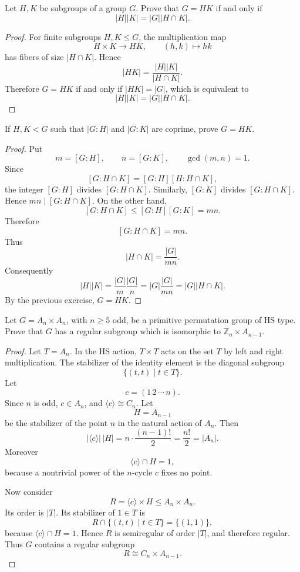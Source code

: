 \begin{exercise}
Let \(H,K\) be subgroups of a group \(G\). Prove that \(G = HK\) if and only if
\[
    |H||K| = |G||H \cap K|.
\]
\end{exercise}

\begin{proof}
For finite subgroups \(H,K\leq G\), the multiplication map
\[
    H\times K\longrightarrow HK,
    \qquad
    (h,k)\mapsto hk
\]
has fibers of size \(|H\cap K|\). Hence
\[
    |HK|=\frac{|H||K|}{|H\cap K|}.
\]
Therefore \(G=HK\) if and only if \(|HK|=|G|\), which is equivalent to
\[
    |H||K|=|G||H\cap K|.
\]
\end{proof}

\begin{exercise}
If \(H,K < G\) such that \(|G:H|\) and \(|G:K|\) are coprime, prove
\(G = HK\).
\end{exercise}

\begin{proof}
Put
\[
    m=[G:H],
    \qquad
    n=[G:K],
    \qquad
    \gcd(m,n)=1.
\]
Since
\[
    [G:H\cap K]=[G:H][H:H\cap K],
\]
the integer \([G:H]\) divides \([G:H\cap K]\). Similarly, \([G:K]\) divides
\([G:H\cap K]\). Hence \(mn\mid [G:H\cap K]\). On the other hand,
\[
    [G:H\cap K]\leq [G:H][G:K]=mn.
\]
Therefore
\[
    [G:H\cap K]=mn.
\]
Thus
\[
    |H\cap K|=\frac{|G|}{mn}.
\]
Consequently
\[
    |H||K|
    =
    \frac{|G|}{m}\frac{|G|}{n}
    =
    |G|\frac{|G|}{mn}
    =
    |G||H\cap K|.
\]
By the previous exercise, \(G=HK\).
\end{proof}

\begin{exercise}
Let \(G = A_n \times A_n\), with \(n \geq 5\) odd, be a primitive permutation
group of HS type. Prove that \(G\) has a regular subgroup which is isomorphic to
\(\mathbb{Z}_n \times A_{n-1}\).
\end{exercise}

\begin{proof}
Let \(T=A_n\). In the HS action, \(T\times T\) acts on the set \(T\) by left and
right multiplication. The stabilizer of the identity element is the diagonal
subgroup
\[
    \{(t,t)\mid t\in T\}.
\]
Let
\[
    c=(1\,2\,\cdots\, n).
\]
Since \(n\) is odd, \(c\in A_n\), and \(\langle c\rangle\cong C_n\). Let
\[
    H=A_{n-1}
\]
be the stabilizer of the point \(n\) in the natural action of \(A_n\). Then
\[
    |\langle c\rangle|\,|H|
    =
    n\cdot \frac{(n-1)!}{2}
    =
    \frac{n!}{2}
    =
    |A_n|.
\]
Moreover
\[
    \langle c\rangle\cap H=1,
\]
because a nontrivial power of the \(n\)-cycle \(c\) fixes no point.

Now consider
\[
    R=\langle c\rangle\times H\leq A_n\times A_n.
\]
Its order is \(|T|\). Its stabilizer of \(1\in T\) is
\[
    R\cap \{(t,t)\mid t\in T\}
    =
    \{(1,1)\},
\]
because \(\langle c\rangle\cap H=1\). Hence \(R\) is semiregular of order
\(|T|\), and therefore regular. Thus \(G\) contains a regular subgroup
\[
    R\cong C_n\times A_{n-1}.
\]
\end{proof}

